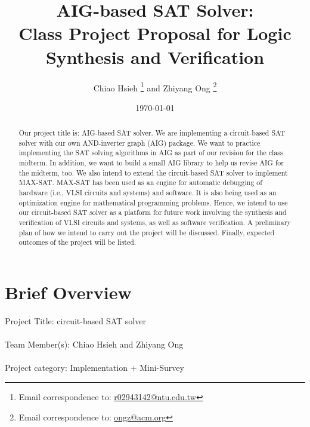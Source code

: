 \documentclass[letter,12pt]{article}
\begin{document}
\title{AIG-based SAT Solver: \\
	{\Large Class Project Proposal for Logic Synthesis and Verification}}
\date{\today}
\author{Chiao Hsieh
	\thanks{Email correspondence to: \href{mailto:r02943142@ntu.edu.tw}{r02943142@ntu.edu.tw}}
	and Zhiyang Ong
	\thanks{Email correspondence to: \href{mailto:ongz@acm.org}{ongz@acm.org}}
}
\maketitle

\begin{abstract}
Our project title is: AIG-based SAT solver. We are implementing a circuit-based SAT solver with our own AND-inverter graph (AIG) package. We want to practice implementing the SAT solving algorithms in AIG as part of our revision for the class midterm. In addition, we want to build a small AIG library to help us revise AIG for the midterm, too. We also intend to extend the circuit-based SAT solver to implement MAX-SAT. MAX-SAT has been used as an engine for automatic debugging of hardware (i.e., VLSI circuits and systems) and software. It is also being used as an optimization engine for mathematical programming problems. Hence, we intend to use our circuit-based SAT solver as a platform for future work involving the synthesis and verification of VLSI circuits and systems, as well as software verification. A preliminary plan of how we intend to carry out the project will be discussed. Finally, expected outcomes of the project will be listed.
\end{abstract}




%	



\section{Brief Overview}
\label{sec:briefoverview}

Project Title: circuit-based SAT solver \\
\ \\
Team Member(s): Chiao Hsieh and Zhiyang Ong \\
\ \\
Project category: Implementation + Mini-Survey
\end{document}
